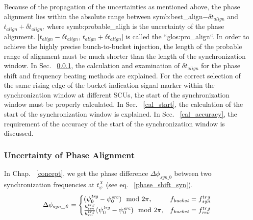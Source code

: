 Because of the propagation of the uncertainties as mentioned above, the phase alignment lies within the absolute range between \gls{symb:best_align}$-\delta t_\mathit{align}$ and $t_\mathit{align}+\delta t_\mathit{align}$, where \gls{symb:probable_aligh} is the uncertainty of the phase alignment. [$t_\mathit{align}-\delta t_\mathit{align}$, $t_\mathit{align}+\delta t_\mathit{align}$] is called the ``\gls{glos:pro_align}``. In order to achieve the highly precise bunch-to-bucket injection, the length of the probable range of alignment must be much shorter than the length of the synchronization window. In Sec. ~\ref{cal_align}, the calculation and examination of $\delta t_\mathit{align}$ for the phase shift and frequency beating methods are explained. For the correct selection of the same rising edge of the bucket indication signal marker within the synchronization window at different SCUs, the start of the synchronization window must be properly calculated. In Sec.  ~\ref{cal_start}, the calculation of the start of the synchronization window is explained. In Sec.  ~\ref{cal_accuracy}, the requirement of the accuracy of the start of the synchronization window is discussed. 

\subsubsection{Uncertainty of Phase Alignment}
\label{cal_align}
In Chap. ~\ref{concept}, we get the phase difference $\Delta \phi_\mathit{syn\_0}$ between two synchronization frequencies at $t_\psi^X$ (see eq. ~\ref{phase_shift_syn}).
\begin{eqnarray}\label{phase_syn}
\Delta \phi_\mathit{syn\_0}=
\begin{cases}
(\psi^\mathit{trg}_0-\psi^\mathit{src}_0) \mod 2\pi, &f_{\mathit{bucket}}=f_{\mathit{syn}}^{trg}\cr
\frac{h_{\mathit{syn}}^{trg}}{h_{\mathit{rev}}^{trg}}(\psi^\mathit{trg}_0-\psi^\mathit{src}_0) \mod 2\pi, &f_{\mathit{bucket}}=f_{\mathit{rev}}^{trg}\cr
\end{cases}
\end{eqnarray}


